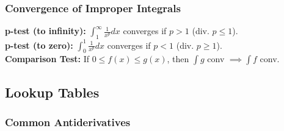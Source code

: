 \subsubsection{Convergence of Improper Integrals}
\textbf{p-test (to infinity):} $\int_1^\infty \frac{1}{x^p} dx$ converges if $p > 1$ (div. $p \le 1$). \\
\textbf{p-test (to zero):} $\int_0^1 \frac{1}{x^p} dx$ converges if $p < 1$ (div. $p \ge 1$). \\
\textbf{Comparison Test:} If $0 \le f(x) \le g(x)$, then $\int g$ conv $\implies \int f$ conv.

\subsection{Lookup Tables}

\subsubsection{Common Antiderivatives}
